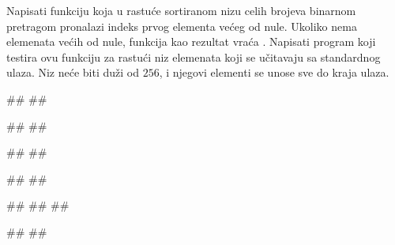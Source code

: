 \begin{Answer}[ref=406]
\end{Answer}
\begin{Exercise}[label=407]
Napisati funkciju koja u rastuće sortiranom nizu celih brojeva
binarnom pretragom pronalazi indeks prvog elementa većeg od
nule. Ukoliko nema elemenata većih od nule, funkcija kao rezultat
vraća . Napisati program koji testira ovu funkciju za rastući
niz elemenata koji se učitavaju sa standardnog ulaza. Niz neće biti
duži od $256$, i njegovi elementi se unose sve do kraja ulaza.

\begin{minitest}
\begin{test}{1}
#\naslovUlaz#
##

#\naslovIzlaz#
##
\end{test}
\end{minitest}
\begin{minitest}
\begin{test}{2}
#\naslovUlaz#
##

#\naslovIzlaz#
##
\end{test}
\end{minitest}
\begin{minitest}
\begin{test}{3}
#\naslovUlaz#
##
##
  
#\naslovIzlaz#
##
\end{test}
\end{minitest}


\end{Exercise}
\begin{Answer}[ref=407]
\end{Answer}
